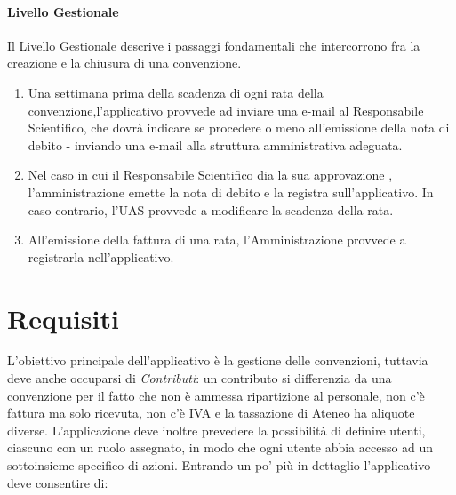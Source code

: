 \paragraph{Livello Gestionale}
Il Livello Gestionale descrive i passaggi fondamentali che intercorrono fra la creazione e la chiusura di una convenzione.\newline
\begin{enumerate}
\item Una settimana prima della scadenza di ogni rata della convenzione,l'applicativo provvede ad inviare una e-mail al Responsabile Scientifico, che dovrà indicare se procedere o meno all'emissione della nota di debito - inviando una e-mail alla struttura amministrativa adeguata.
\item Nel caso in cui il Responsabile Scientifico dia la sua approvazione , l'amministrazione emette la nota di debito e la registra sull'applicativo. In caso contrario, l'UAS provvede a modificare la scadenza della rata.
\item All'emissione della fattura di una rata, l'Amministrazione provvede a registrarla nell'applicativo.\newline
\end{enumerate}

\section{Requisiti}
L'obiettivo principale dell'applicativo è la gestione delle convenzioni, tuttavia deve anche occuparsi di \textsl{Contributi}: un contributo si differenzia da una convenzione per il fatto che non è ammessa ripartizione al personale, non c'è fattura ma solo ricevuta, non c'è IVA e la tassazione di Ateneo ha aliquote diverse.\newline
L'applicazione deve inoltre prevedere la possibilità di definire utenti, ciascuno con un ruolo assegnato, in modo che ogni utente abbia accesso ad un sottoinsieme specifico di azioni. Entrando un po' più in dettaglio l'applicativo deve consentire di:

